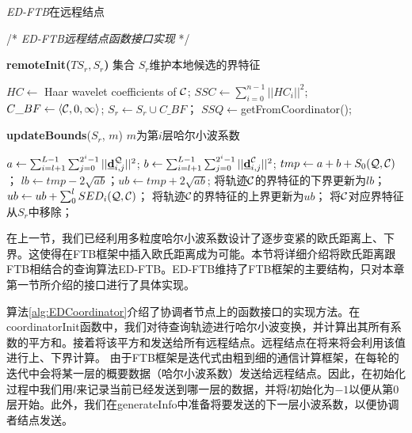 \begin{algorithm}[t]
	\renewcommand{\baselinestretch}{1}
	\caption{{\sl ED-FTB}\label{alg:EDRemote}在远程结点}
	\begin{algorithmic}[2]
		\STATE /* \emph{ED-FTB远程结点函数接口实现} */
	\end{algorithmic}
	
	\textbf{remoteInit($TS_{r} , S_{r}$)} \qquad  集合 $S_{r}$维护本地候选的界特征
	\begin{algorithmic}[1]
		\STATE $HC \leftarrow$ Haar wavelet coefficients of $\cal C$; 
		\STATE $SSC \leftarrow \sum_{i=0}^{n-1}||HC_{i}||^2$;	   
		\ENDFOR
		\ENDIF
		\STATE $C\_BF \leftarrow  \langle  {\cal C}, 0,\infty \rangle$; 
		\STATE $S_{r} \leftarrow S_{r} \cup C\_BF$；
		\ENDFOR
		\STATE $SSQ \leftarrow$\textsf{getFromCoordinator}();
	\end{algorithmic}
	
	\textbf{updateBounds}($S_{r}$, $m$) \quad  $m$为第$i$层哈尔小波系数 
	\begin{algorithmic}[1]
		\STATE  $a \leftarrow \sum_{i=l+1}^{L-1}\sum_{j=0}^{2^i-1}||\emph{{\textbf{d}}}_{i,j}^{\cal Q}||^2$; $b \leftarrow \sum_{i=l+1}^{L-1}\sum_{j=0}^{2^i-1}||\emph{{\textbf{d}}}_{i,j}^{\cal C}||^2$;
		\STATE $tmp \leftarrow a+b+S_{0}(\cal Q, \cal C)$；
		\STATE $lb \leftarrow tmp -2\sqrt{ab}$；$ub \leftarrow tmp+2\sqrt{ab}$;
		\STATE 将轨迹$\cal C$的界特征的下界更新为$lb$；
		\STATE $ ub \leftarrow ub+ \sum_{0}^{l}SED_{i}({\cal Q}, {\cal C})$；
		\STATE 将轨迹$\cal C$的界特征的上界更新为$ub$；
		\ENDIF
		\ELSE
		\STATE 将$\cal C$对应界特征从$S_{r}$中移除；
		\ENDIF
		\ENDFOR
	\end{algorithmic}
\end{algorithm}

在上一节，我们已经利用多粒度哈尔小波系数设计了逐步变紧的欧氏距离上、下界。这使得在FTB框架中插入欧氏距离成为可能。本节将详细介绍将欧氏距离跟FTB相结合的查询算法ED-FTB。ED-FTB维持了FTB框架的主要结构，只对本章第一节所介绍的接口进行了具体实现。

算法\ref{alg:EDCoordinator}介绍了协调者节点上的函数接口的实现方法。在\textsf{coordinatorInit}函数中，我们对待查询轨迹进行哈尔小波变换，并计算出其所有系数的平方和。接着将该平方和发送给所有远程结点。远程结点在将来将会利用该值进行上、下界计算。
由于FTB框架是迭代式由粗到细的通信计算框架，在每轮的迭代中会将某一层的概要数据（哈尔小波系数）发送给远程结点。因此，在初始化过程中我们用$l$来记录当前已经发送到哪一层的数据，并将$l$初始化为$-1$以便从第0层开始。此外，我们在\textsf{generateInfo}中准备将要发送的下一层小波系数，以便协调者结点发送。

